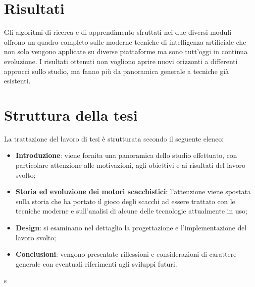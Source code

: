 \section{Risultati}
Gli algoritmi di ricerca e di apprendimento sfruttati nei due diversi moduli offrono un quadro completo sulle moderne tecniche di intelligenza
artificiale che non solo vengono applicate su diverse piattaforme ma sono tutt'oggi in continua evoluzione. 
I risultati ottenuti non vogliono aprire nuovi orizzonti a differenti approcci sullo studio, 
ma fanno più da panoramica generale a tecniche già esistenti.

\section{Struttura della tesi}
La trattazione del lavoro di tesi è strutturata secondo il seguente elenco:
\begin{itemize}
    \item \textbf{Introduzione}: viene fornita una panoramica dello studio effettuato, con particolare attenzione alle motivazioni, 
    agli obiettivi e ai risultati del lavoro svolto;
    \item \textbf{Storia ed evoluzione dei motori scacchistici}: l'attenzione viene spostata sulla 
    storia che ha portato il gioco degli scacchi ad essere trattato con le tecniche moderne e sull'analisi di alcune delle tecnologie attualmente in uso;
    \item \textbf{Design}: si esaminano nel dettaglio la progettazione e l'implementazione del lavoro svolto;
    \item \textbf{Conclusioni}: vengono presentate riflessioni e considerazioni di carattere generale con eventuali riferimenti agli sviluppi futuri.
\end{itemize}
s